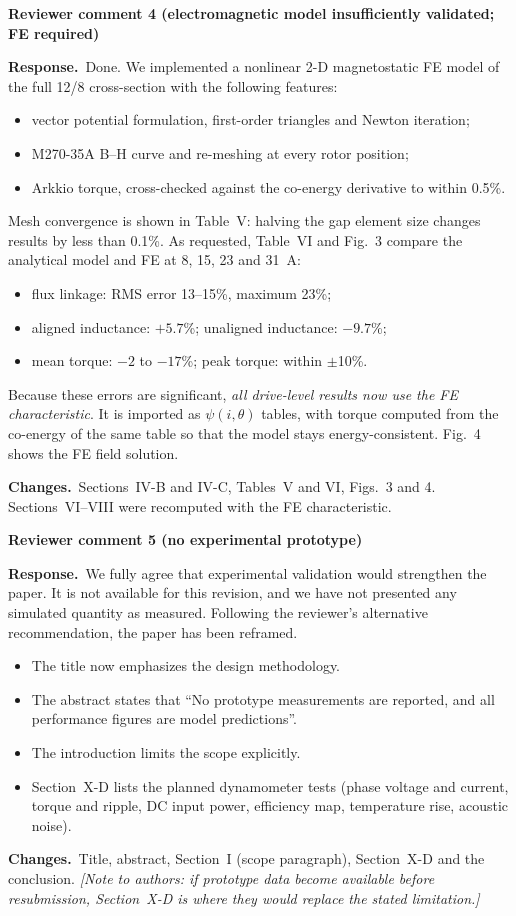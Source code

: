 \documentclass[10pt]{article}
\newcommand{\rev}[1]{\par\medskip\noindent\textbf{Reviewer comment #1}\par}
\newcommand{\resp}{\par\noindent\textcolor{blue!50!black}{\textbf{Response.}}~}
\newcommand{\chg}{\par\noindent\textcolor{green!35!black}{\textbf{Changes.}}~}
\begin{document}
\rev{4 (electromagnetic model insufficiently validated; FE required)}
\resp Done. We implemented a nonlinear 2-D magnetostatic FE model of the full
12/8 cross-section with the following features:
\begin{itemize}[nosep]
\item vector potential formulation, first-order triangles and Newton iteration;
\item M270-35A B--H curve and re-meshing at every rotor position;
\item Arkkio torque, cross-checked against the co-energy derivative to within
0.5\%.
\end{itemize}
Mesh convergence is shown in Table~V: halving the gap element size changes
results by less than 0.1\%. As requested, Table~VI and Fig.~3 compare the
analytical model and FE at 8, 15, 23 and 31~A:
\begin{itemize}[nosep]
\item flux linkage: RMS error 13--15\%, maximum 23\%;
\item aligned inductance: $+5.7$\%; unaligned inductance: $-9.7$\%;
\item mean torque: $-2$ to $-17$\%; peak torque: within $\pm$10\%.
\end{itemize}
Because these errors are significant, \emph{all drive-level results now use the
FE characteristic}. It is imported as $\psi(i,\theta)$ tables, with torque
computed from the co-energy of the same table so that the model stays
energy-consistent. Fig.~4 shows the FE field solution.
\chg Sections~IV-B and IV-C, Tables~V and VI, Figs.~3 and 4. Sections~VI--VIII
were recomputed with the FE characteristic.

\rev{5 (no experimental prototype)}
\resp We fully agree that experimental validation would strengthen the paper.
It is not available for this revision, and we have not presented any
simulated quantity as measured. Following the reviewer's alternative
recommendation, the paper has been reframed.
\begin{itemize}[nosep]
\item The title now emphasizes the design methodology.
\item The abstract states that ``No prototype measurements are reported, and
all performance figures are model predictions''.
\item The introduction limits the scope explicitly.
\item Section~X-D lists the planned dynamometer tests (phase voltage and
current, torque and ripple, DC input power, efficiency map, temperature rise,
acoustic noise).
\end{itemize}
\chg Title, abstract, Section~I (scope paragraph), Section~X-D and the conclusion.
\emph{[Note to authors: if prototype data become available before
resubmission, Section~X-D is where they would replace the stated limitation.]}
\end{document}
